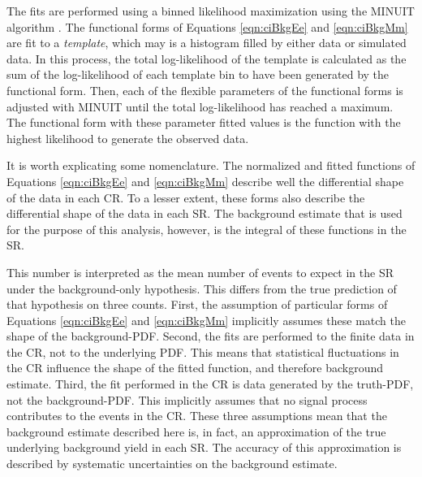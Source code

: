 The fits are performed using a binned likelihood maximization using the MINUIT algorithm \cite{minuit}.
The functional forms of Equations \ref{eqn:ciBkgEe} and \ref{eqn:ciBkgMm} are fit to a \emph{template}, which may is a histogram filled by either data or simulated data.
In this process, the total log-likelihood of the template is calculated as the sum of the log-likelihood of each template bin to have been generated by the functional form.
Then, each of the flexible parameters of the functional forms is adjusted with MINUIT until the total log-likelihood has reached a maximum.
The functional form with these parameter fitted values is the function with the highest likelihood to generate the observed data.

It is worth explicating some nomenclature. 
The normalized and fitted functions of Equations \ref{eqn:ciBkgEe} and \ref{eqn:ciBkgMm} describe well the differential shape of the data in each CR.
To a lesser extent, these forms also describe the differential shape of the data in each SR.
The background estimate that is used for the purpose of this analysis, however, is the integral of these functions in the SR.

This number is interpreted as the mean number of events to expect in the SR under the background-only hypothesis.
This differs from the true prediction of that hypothesis on three counts.
First, the assumption of particular forms of Equations \ref{eqn:ciBkgEe} and \ref{eqn:ciBkgMm} implicitly assumes these match the shape of the background-PDF.
Second, the fits are performed to the finite data in the CR, not to the underlying PDF.
This means that statistical fluctuations in the CR influence the shape of the fitted function, and therefore background estimate.
Third, the fit performed in the CR is data generated by the truth-PDF, not the background-PDF. 
This implicitly assumes that no signal process contributes to the events in the CR. 
These three assumptions mean that the background estimate described here is, in fact, an approximation of the true underlying background yield in each SR.
The accuracy of this approximation is described by systematic uncertainties on the background estimate.

